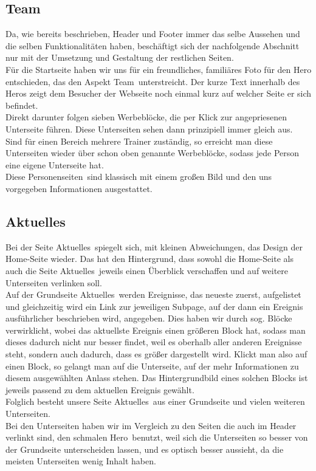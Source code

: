 \documentclass[12pt,a4paper]{article}
\begin{document}
\subsection{Team}
Da, wie bereits beschrieben, Header und Footer immer das selbe Aussehen und die selben Funktionalitäten haben, beschäftigt sich der nachfolgende Abschnitt nur mit der Umsetzung und Gestaltung der restlichen Seiten.\\
Für die Startseite haben wir uns für ein freundliches, familiäres Foto für den Hero entschieden, das den Aspekt \dq Team\dq \ unterstreicht.
Der kurze Text innerhalb des Heros zeigt dem Besucher der Webseite noch einmal kurz auf welcher Seite er sich befindet.\\
Direkt darunter folgen sieben Werbeblöcke, die per Klick zur angepriesenen Unterseite führen. Diese Unterseiten sehen dann prinzipiell immer gleich aus. Sind für einen Bereich mehrere Trainer zuständig, so erreicht man diese Unterseiten wieder über schon oben genannte Werbeblöcke, sodass jede Person eine eigene Unterseite hat.\\
Diese \dq Personenseiten\dq \ sind klassisch mit einem großen Bild und den uns vorgegeben Informationen ausgestattet.
\subsection{Aktuelles}
Bei der Seite \dq Aktuelles\dq \ spiegelt sich, mit kleinen Abweichungen, das Design der Home-Seite wieder. Das hat den Hintergrund, dass sowohl die Home-Seite als auch die Seite  \dq Aktuelles\dq \ jeweils einen Überblick verschaffen und auf weitere Unterseiten verlinken soll.\\
Auf der Grundseite \dq Aktuelles\dq \ werden Ereignisse, das neueste zuerst, aufgelistet und gleichzeitig wird ein Link zur jeweiligen Subpage, auf der dann ein Ereignis ausführlicher beschrieben wird, angegeben. Dies haben wir durch sog. Blöcke verwirklicht, wobei das aktuellste Ereignis einen größeren Block hat, sodass man dieses dadurch nicht nur besser findet, weil es oberhalb aller anderen Ereignisse steht, sondern auch dadurch, dass es größer dargestellt wird. Klickt man also auf einen Block, so gelangt man auf die Unterseite, auf der mehr Informationen zu diesem ausgewählten Anlass stehen. Das Hintergrundbild  eines solchen Blocks ist jeweils passend zu dem aktuellen Ereignis gewählt.\\
Folglich besteht unsere Seite \dq Aktuelles\dq \ aus einer Grundseite und vielen weiteren Unterseiten.\\
Bei den Unterseiten haben wir im Vergleich zu den Seiten die auch im Header verlinkt sind, den schmalen \dq Hero\dq \ benutzt, weil sich die Unterseiten so besser von der Grundseite unterscheiden lassen, und es optisch besser aussieht, da die meisten Unterseiten wenig Inhalt haben.
\end{document}
